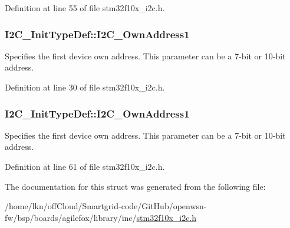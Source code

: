 Definition at line 55 of file stm32f10x\+\_\+i2c.\+h.

\subsubsection[{\texorpdfstring{I2\+C\+\_\+\+Own\+Address1}{I2C_OwnAddress1}}]{ I2\+C\+\_\+\+Init\+Type\+Def\+::\+I2\+C\+\_\+\+Own\+Address1}\hypertarget{struct_i2_c___init_type_def_ad4e6a2d4e93b55e48070c95b44615fb7}{}\label{struct_i2_c___init_type_def_ad4e6a2d4e93b55e48070c95b44615fb7}
Specifies the first device own address. This parameter can be a 7-\/bit or 10-\/bit address. 

Definition at line 30 of file stm32f10x\+\_\+i2c.\+h.

\subsubsection[{\texorpdfstring{I2\+C\+\_\+\+Own\+Address1}{I2C_OwnAddress1}}]{ I2\+C\+\_\+\+Init\+Type\+Def\+::\+I2\+C\+\_\+\+Own\+Address1}\hypertarget{struct_i2_c___init_type_def_a08543cb71b4b2a89ad81a2cefff12b53}{}\label{struct_i2_c___init_type_def_a08543cb71b4b2a89ad81a2cefff12b53}
Specifies the first device own address. This parameter can be a 7-\/bit or 10-\/bit address. 

Definition at line 61 of file stm32f10x\+\_\+i2c.\+h.



The documentation for this struct was generated from the following file\+:\begin{DoxyCompactItemize}
\item 
/home/lkn/off\+Cloud/\+Smartgrid-\/code/\+Git\+Hub/openwsn-\/fw/bsp/boards/agilefox/library/inc/\hyperlink{agilefox_2library_2inc_2stm32f10x__i2c_8h}{stm32f10x\+\_\+i2c.\+h}\end{DoxyCompactItemize}
